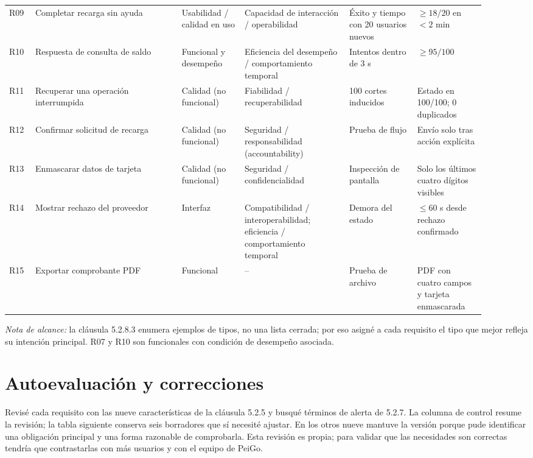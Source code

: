 \documentclass[10pt,letterpaper]{article}
\begin{document}
\begin{longtable}{@{}p{0.05\linewidth}p{0.28\linewidth}p{0.12\linewidth}p{0.20\linewidth}p{0.13\linewidth}p{0.13\linewidth}@{}}
R09&Completar recarga sin ayuda&Usabilidad / calidad en uso&Capacidad de interacción / operabilidad&Éxito y tiempo con 20 usuarios nuevos&$\geq 18/20$ en $<2$ min\\
R10&Respuesta de consulta de saldo&Funcional y desempeño&Eficiencia del desempeño / comportamiento temporal&Intentos dentro de 3 s&$\geq 95/100$\\
R11&Recuperar una operación interrumpida&Calidad (no funcional)&Fiabilidad / recuperabilidad&100 cortes inducidos&Estado en 100/100; 0 duplicados\\
R12&Confirmar solicitud de recarga&Calidad (no funcional)&Seguridad / responsabilidad (accountability)&Prueba de flujo&Envío solo tras acción explícita\\
R13&Enmascarar datos de tarjeta&Calidad (no funcional)&Seguridad / confidencialidad&Inspección de pantalla&Solo los últimos cuatro dígitos visibles\\
R14&Mostrar rechazo del proveedor&Interfaz&Compatibilidad / interoperabilidad; eficiencia / comportamiento temporal&Demora del estado&$\leq 60$ s desde rechazo confirmado\\
R15&Exportar comprobante PDF&Funcional&--&Prueba de archivo&PDF con cuatro campos y tarjeta enmascarada\\
\bottomrule
\end{longtable}
\normalsize
\textit{Nota de alcance:} la cláusula 5.2.8.3 enumera ejemplos de tipos, no una lista cerrada; por eso asigné a cada requisito el tipo que mejor refleja su intención principal. R07 y R10 son funcionales con condición de desempeño asociada.

\section{Autoevaluación y correcciones}
Revisé cada requisito con las nueve características de la cláusula 5.2.5 y busqué términos de alerta de 5.2.7. La columna de control resume la revisión; la tabla siguiente conserva seis borradores que sí necesité ajustar. En los otros nueve mantuve la versión porque pude identificar una obligación principal y una forma razonable de comprobarla. Esta revisión es propia; para validar que las necesidades son correctas tendría que contrastarlas con más usuarios y con el equipo de PeiGo.
\end{document}
